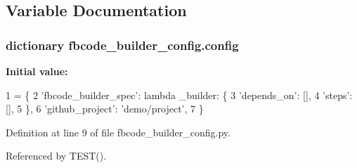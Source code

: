 \subsection{Variable Documentation}
\subsubsection[{config}]{\setlength{\rightskip}{0pt plus 5cm}dictionary fbcode\+\_\+builder\+\_\+config.\+config}\label{namespacefbcode__builder__config_ab8374f9e32b2b4f2d4ad80ba2944355c}
{\bfseries Initial value\+:}
\begin{DoxyCode}
1 = \{
2     \textcolor{stringliteral}{'fbcode\_builder\_spec'}: \textcolor{keyword}{lambda} \_builder: \{
3         \textcolor{stringliteral}{'depends\_on'}: [],
4         \textcolor{stringliteral}{'steps'}: [],
5     \},
6     \textcolor{stringliteral}{'github\_project'}: \textcolor{stringliteral}{'demo/project'},
7 \}
\end{DoxyCode}


Definition at line 9 of file fbcode\+\_\+builder\+\_\+config.\+py.



Referenced by T\+E\+S\+T().

